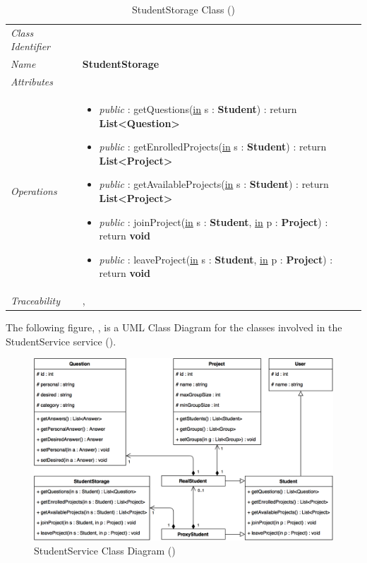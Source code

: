 \documentclass[12pt,letterpaper]{article}
\begin{document}
\begin{table}[H]
    \caption{StudentStorage Class ()} 
	\begin{tabu} to 
		\toprule
		Class Identifier &  \\
		Name & {\bf StudentStorage} \\
		Attributes & \\

		Operations &
		\begin{minipage}[t]{\linewidth}
			\begin{itemize}
			    \item {\it public} : getQuestions(\underline{in} s : {\bf Student}) : return {\bf List<Question>}
			    \item {\it public} : getEnrolledProjects(\underline{in} s : {\bf Student}) : return {\bf List<Project>}
			    \item {\it public} : getAvailableProjects(\underline{in} s : {\bf Student}) : return {\bf List<Project>}
			    \item {\it public} : joinProject(\underline{in} s : {\bf Student}, \underline{in} p : {\bf Project}) : return {\bf void}
			    \item {\it public} : leaveProject(\underline{in} s : {\bf Student}, \underline{in} p : {\bf Project}) : return {\bf void}
	        \end{itemize}
	    \end{minipage} \\
	    	Traceability & , \\
		\toprule
	\end{tabu}
\end{table}

\newpage{}
The following figure, , is a UML Class Diagram for the classes involved in the StudentService service ().

\begin{figure}[H]
	\centering{}
	\includegraphics[scale=0.33]{imgs/d3/interfaces/student.png}
	\caption{StudentService Class Diagram ()}
\end{figure}
\end{document}
